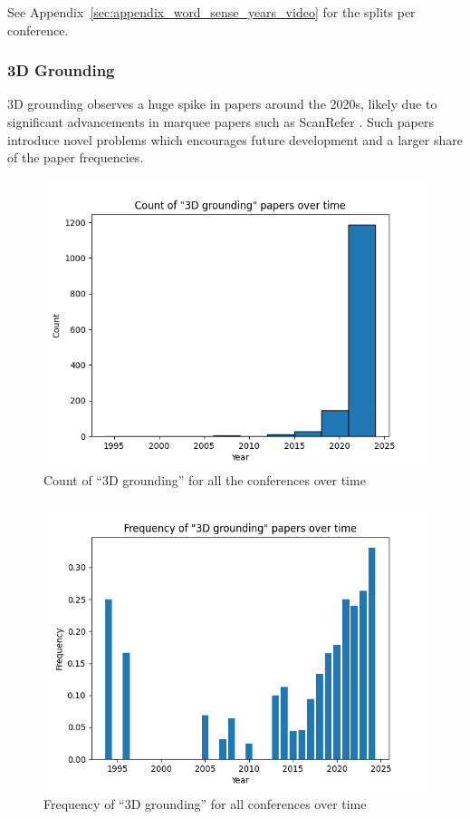 \documentclass[11pt]{article}
\begin{document}
See Appendix~\ref{sec:appendix_word_sense_years_video} for the splits per conference.

\subsubsection{3D Grounding}
3D grounding observes a huge spike in papers around the 2020s, likely due to significant advancements in marquee papers such as ScanRefer \cite{chen2020scanrefer3dobjectlocalization,liu2024surveytextguided3dvisual}. Such papers introduce novel problems which encourages future development and a larger share of the paper frequencies.
\begin{figure}[h!]
  \includegraphics[width=\columnwidth]{figs/grounding_figs/3D/all_confs_grounding_3D.png}
  \caption{Count of ``3D grounding'' for all the conferences over time}
  \label{fig:3d_all_confs_count}
\end{figure}

\begin{figure}[h!]
  \includegraphics[width=\columnwidth]{figs/freq_grounding_figs/3D/all_confs_grounding_3D.png}
  \caption{Frequency of ``3D grounding'' for all conferences over time}
  \label{fig:3d_all_confs_freq}
\end{figure}
\end{document}
